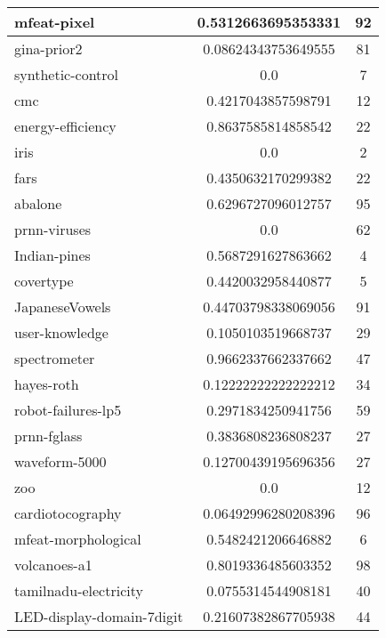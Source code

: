 \documentclass[times,specification,annotation]{itmo-student-thesis}
\begin{document}
\begin{center}
\begin{longtable}{ |m{5cm}|c|c| }
			\hline
			mfeat-pixel & 0.5312663695353331 & 92 \\
			\hline
			gina-prior2 & 0.08624343753649555 & 81 \\
			\hline
			synthetic-control & 0.0 & 7 \\
			\hline
			cmc & 0.4217043857598791 & 12 \\
			\hline
			energy-efficiency & 0.8637585814858542 & 22 \\
			\hline
			iris & 0.0 & 2 \\
			\hline
			fars & 0.4350632170299382 & 22 \\
			\hline
			abalone & 0.6296727096012757 & 95 \\
			\hline
			prnn-viruses & 0.0 & 62 \\
			\hline
			Indian-pines & 0.5687291627863662 & 4 \\
			\hline
			covertype & 0.4420032958440877 & 5 \\
			\hline
			JapaneseVowels & 0.44703798338069056 & 91 \\
			\hline
			user-knowledge & 0.1050103519668737 & 29 \\
			\hline
			spectrometer & 0.9662337662337662 & 47 \\
			\hline
			hayes-roth & 0.12222222222222212 & 34 \\
			\hline
			robot-failures-lp5 & 0.2971834250941756 & 59 \\
			\hline
			prnn-fglass & 0.3836808236808237 & 27 \\
			\hline
			waveform-5000 & 0.12700439195696356 & 27 \\
			\hline
			zoo & 0.0 & 12 \\
			\hline
			cardiotocography & 0.06492996280208396 & 96 \\
			\hline
			mfeat-morphological & 0.5482421206646882 & 6 \\
			\hline
			volcanoes-a1 & 0.8019336485603352 & 98 \\
			\hline
			tamilnadu-electricity & 0.0755314544908181 & 40 \\
			\hline
			LED-display-domain-7digit & 0.21607382867705938 & 44 \\
			\hline
			
		\end{longtable}
	\end{center}
	
\end{document}
